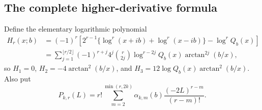 \documentclass[11pt,a4paper]{article}
\numberwithin{equation}{section}
\theoremstyle{definition}
\theoremstyle{remark}
\begin{document}
\subsection{The complete higher-derivative formula}

Define the elementary logarithmic polynomial
\begin{align}
 H_r(x;b)
 &=(-1)^r\left[2^{r-1}
       \{\log^r(x+ib)+\log^r(x-ib)\}-\log^r Q_b(x)\right]
       \label{sd:eq:H-log}\\
 &=\sum_{j=1}^{\lfloor r/2\rfloor}
       (-1)^{r+j}4^j\binom r{2j}
       \log^{r-2j}Q_b(x)\arctan^{2j}(b/x),
       \label{sd:eq:H-real}
\end{align}
so $H_1=0$, $H_2=-4\arctan^2(b/x)$, and
$H_3=12\log Q_b(x)\arctan^2(b/x)$.  Also put
\begin{equation}\label{sd:eq:Pr}
 P_{k,r}(L)=r!\sum_{m=2}^{\min(r,2k)}
          \alpha_{k,m}(b)\frac{(-2L)^{r-m}}{(r-m)!}.
\end{equation}
\end{document}
